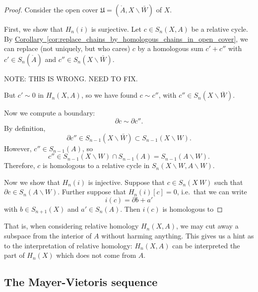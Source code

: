 \documentclass[main.tex]{subfiles}
\begin{document}
\begin{proof}
  Consider the open cover \(\mathfrak{U} = (\mathring{A}, X \smallsetminus \bar{W} )\) of \(X\).

  First, we show that \(H_{n}(i)\) is surjective. Let \(c \in S_{n}(X, A)\) be a relative cycle. By \hyperref[cor:replace_chains_by_homologous_chains_in_open_cover]{Corollary~\ref*{cor:replace_chains_by_homologous_chains_in_open_cover}}, we can replace (not uniquely, but who cares) \(c\) by a homologous sum \(c' + c''\) with \(c' \in S_{n}(\mathring{A})\) and \(c'' \in S_{n}(X \smallsetminus \bar{W})\). 

  NOTE: THIS IS WRONG. NEED TO FIX.

  But \(c' \sim 0\) in \(H_{n}(X, A)\), so we have found \(c \sim c''\), with \(c'' \in S_{n}(X \smallsetminus \bar{W})\).

  Now we compute a boundary:
  \begin{equation*}
    \partial c \sim \partial c''.
  \end{equation*}
  By definition, 
  \begin{equation*}
    \partial c'' \in S_{n-1}(X \smallsetminus \bar{W}) \subset S_{n-1}(X \smallsetminus W).
  \end{equation*}
  However, \(c'' \in S_{n-1}(A)\), so
  \begin{equation*}
    c'' \in S_{n-1}(X \smallsetminus W) \cap S_{n-1}(A) = S_{n-1}(A \smallsetminus W).
  \end{equation*}
  Therefore, \(c\) is homologous to a relative cycle in \(S_{n}(X \smallsetminus W, A \smallsetminus W)\).

  Now we show that \(H_{n}(i)\) is injective. Suppose that \(c \in S_{n}(X \  W)\) such that \(\partial c \in S_{n}(A \smallsetminus W )\). Further suppose that \(H_{n}(i)[c] = 0\), i.e.\ that we can write
  \begin{equation*}
    i(c) = \partial b + a'
  \end{equation*}
  with \(b \in S_{n+1}(X)\) and \(a' \in S_{n}(A)\). Then \(i(c)\) is homologous to
\end{proof}

That is, when considering relative homology $H_{n}(X, A)$, we may cut away a subspace from the interior of $A$ without harming anything. This gives us a hint as to the interpretation of relative homology: $H_{n}(X, A)$ can be interpreted the part of $H_{n}(X)$ which does not come from $A$.

\subsection{The Mayer-Vietoris sequence}
\label{ssc:the_mayer_vietoris_sequence}
\end{document}
